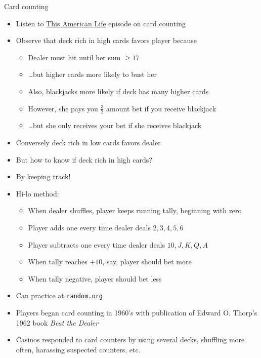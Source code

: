 \documentclass{beamer}
\theoremstyle{definition}
\begin{document}
\begin{frame}{Card counting}
\begin{itemize}
\item Listen to
\href{http://www.thisamericanlife.org/radio-archives/episode/466/blackjack}
{\color{blue}This American Life} episode on card counting
\item Observe that deck rich in high cards favors player because
\begin{itemize}
\item Dealer must hit until her sum $\ge 17$
\item \dots but higher cards more likely to bust her
\item Also, blackjacks more likely if deck has many higher cards
\item However, she pays you $\frac{3}{2}$ amount bet
if you receive blackjack
\item \dots but she only receives your bet if she receives blackjack
\end{itemize}
\item Conversely deck rich in low cards favors dealer
\end{itemize}
\end{frame}

\begin{frame}
\begin{itemize}
\item But how to know if deck rich in high cards?
\item By keeping track!
\item Hi-lo method:
\begin{itemize}
\item When dealer shuffles, player keeps running tally,
beginning with zero
\item Player adds one every time dealer deals $2,3,4,5,6$
\item Player subtracts one every time dealer deals $10,J,K,Q,A$
\item When tally reaches $+10$, say, player should bet more
\item When tally negative, player should bet less
\end{itemize}
\item Can practice at \href{http://www.random.org/playing-cards}
{\color{blue}\tt random.org}
\item Players began card counting in 1960's with publication
of Edward O. Thorp's 1962 book {\em Beat the Dealer}
\item Casinos responded to card counters by using several decks,
shuffling more often, harassing suspected counters, etc.
\end{itemize}
\end{frame}
\end{document}
